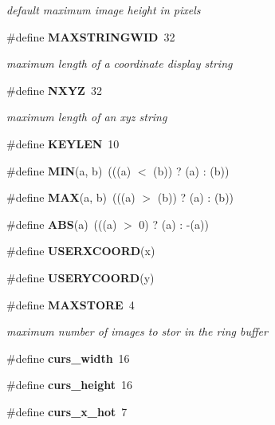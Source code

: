 \begin{CompactItemize}
\begin{CompactList}\small\item\em default maximum image height in pixels \item\end{CompactList}\item 
\#define {\bf MAXSTRINGWID}\ 32\label{xtv_8h_a20}

\begin{CompactList}\small\item\em maximum length of a coordinate display string \item\end{CompactList}\item 
\#define {\bf NXYZ}\ 32\label{xtv_8h_a21}

\begin{CompactList}\small\item\em maximum length of an xyz string \item\end{CompactList}\item 
\#define {\bf KEYLEN}\ 10\label{xtv_8h_a22}

\item 
\#define {\bf MIN}(a, b)\ (((a) $<$ (b)) ? (a) : (b))\label{xtv_8h_a23}

\item 
\#define {\bf MAX}(a, b)\ (((a) $>$ (b)) ? (a) : (b))\label{xtv_8h_a24}

\item 
\#define {\bf ABS}(a)\ (((a) $>$ 0) ? (a) : -(a))\label{xtv_8h_a25}

\item 
\#define {\bf USERXCOORD}(x)
\item 
\#define {\bf USERYCOORD}(y)
\item 
\#define {\bf MAXSTORE}\ 4\label{xtv_8h_a28}

\begin{CompactList}\small\item\em maximum number of images to stor in the ring buffer \item\end{CompactList}\item 
\#define {\bf curs\_\-width}\ 16\label{xtv_8h_a29}

\item 
\#define {\bf curs\_\-height}\ 16\label{xtv_8h_a30}

\item 
\#define {\bf curs\_\-x\_\-hot}\ 7\label{xtv_8h_a31}


\end{CompactItemize}
